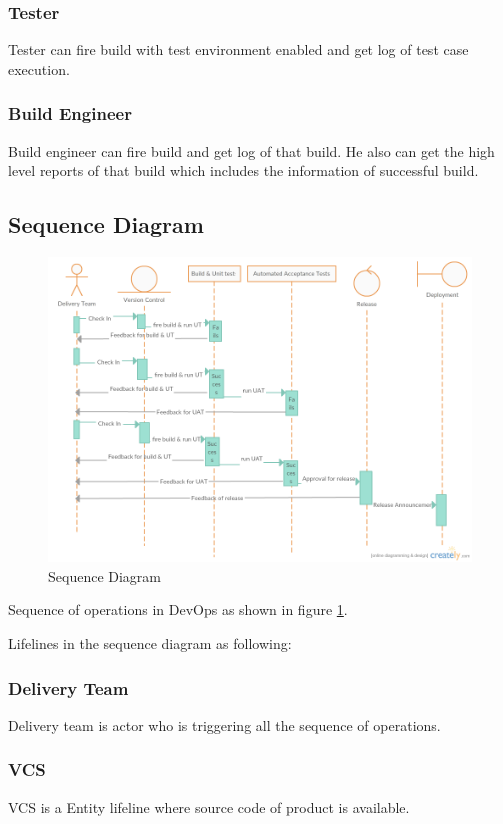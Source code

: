 \documentclass[a4paper,oneside,1,english1pt]{report}
\begin{document}
	\subsubsection{Tester}
	Tester can fire build with test environment enabled and get log of test case execution.
		
	\subsubsection{Build Engineer}
	Build engineer can fire build and get log of that build. He also can get the high level reports of that build which includes the information of successful build.
\subsection{Sequence Diagram}
\begin{figure}[h]
	\includegraphics[width=\linewidth]{diagrams/SequenceDiatransp2.png}
	\caption{Sequence Diagram}
	\label{fig:seq_dia}
\end{figure}
 Sequence of operations in DevOps as shown in figure \ref{fig:seq_dia}.
	
	
	Lifelines in the sequence diagram as following:

		\subsubsection{Delivery Team}
			Delivery team is actor  who is triggering all the sequence of operations. 	
		\subsubsection{\ac{VCS}}
		\ac{VCS} is a Entity lifeline where source code of product is available.
		
\end{document}
